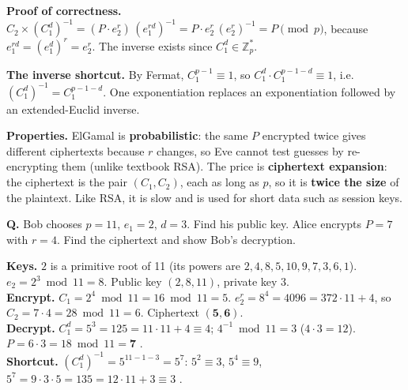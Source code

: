 \textbf{Proof of correctness.} $C_2 \times (C_1^d)^{-1} = (P \cdot e_2^r)\,(e_1^{rd})^{-1} = P \cdot e_2^r\,(e_2^r)^{-1} = P \pmod p$, because $e_1^{rd} = (e_1^d)^r = e_2^r$. The inverse exists since $C_1^d \in \mathbb{Z}_p^*$.

\textbf{The inverse shortcut.} By Fermat, $C_1^{p-1} \equiv 1$, so $C_1^d \cdot C_1^{p-1-d} \equiv 1$, i.e.\ $(C_1^d)^{-1} = C_1^{p-1-d}$. One exponentiation replaces an exponentiation followed by an extended-Euclid inverse.

\textbf{Properties.} ElGamal is \textbf{probabilistic}: the same $P$ encrypted twice gives different ciphertexts because $r$ changes, so Eve cannot test guesses by re-encrypting them (unlike textbook RSA). The price is \textbf{ciphertext expansion}: the ciphertext is the pair $(C_1, C_2)$, each as long as $p$, so it is \textbf{twice the size} of the plaintext. Like RSA, it is slow and is used for short data such as session keys.

\begin{worked}
\textbf{Q.} Bob chooses $p = 11$, $e_1 = 2$, $d = 3$. Find his public key. Alice encrypts $P = 7$ with $r = 4$. Find the ciphertext and show Bob's decryption.

\textbf{Keys.} $2$ is a primitive root of 11 (its powers are $2, 4, 8, 5, 10, 9, 7, 3, 6, 1$). $e_2 = 2^3 \bmod 11 = 8$. Public key $(2, 8, 11)$, private key $3$.\\
\textbf{Encrypt.} $C_1 = 2^4 \bmod 11 = 16 \bmod 11 = 5$. \;$e_2^r = 8^4 = 4096 = 372 \cdot 11 + 4$, so $C_2 = 7 \cdot 4 = 28 \bmod 11 = 6$. Ciphertext $\mathbf{(5, 6)}$.\\
\textbf{Decrypt.} $C_1^d = 5^3 = 125 = 11 \cdot 11 + 4 \equiv 4$; \;$4^{-1} \bmod 11 = 3$ ($4 \cdot 3 = 12$). \;$P = 6 \cdot 3 = 18 \bmod 11 = \mathbf{7}$ \checkmark.\\
\textbf{Shortcut.} $(C_1^d)^{-1} = 5^{11-1-3} = 5^7$: $5^2 \equiv 3$, $5^4 \equiv 9$, $5^7 = 9 \cdot 3 \cdot 5 = 135 = 12 \cdot 11 + 3 \equiv 3$ \checkmark.
\end{worked}


